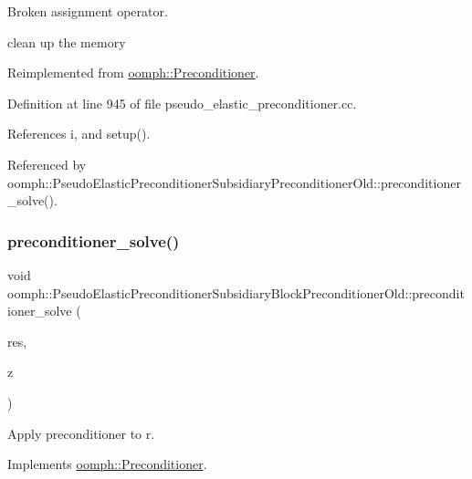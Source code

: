 Broken assignment operator. 

clean up the memory 

Reimplemented from \hyperlink{classoomph_1_1Preconditioner_a46c31c416829bedcd9db238431262027}{oomph\+::\+Preconditioner}.



Definition at line 945 of file pseudo\+\_\+elastic\+\_\+preconditioner.\+cc.



References i, and setup().



Referenced by oomph\+::\+Pseudo\+Elastic\+Preconditioner\+Subsidiary\+Preconditioner\+Old\+::preconditioner\+\_\+solve().

\mbox{\label{classoomph_1_1PseudoElasticPreconditionerSubsidiaryBlockPreconditionerOld_a31f3b927696c11c90f704178cae13e7e}} 
\subsubsection{\texorpdfstring{preconditioner\+\_\+solve()}{preconditioner\_solve()}}
{\footnotesize\ttfamily void oomph\+::\+Pseudo\+Elastic\+Preconditioner\+Subsidiary\+Block\+Preconditioner\+Old\+::preconditioner\+\_\+solve (\begin{DoxyParamCaption}\item[{const \hyperlink{classoomph_1_1DoubleVector}{Double\+Vector} \&}]{res,  }\item[{\hyperlink{classoomph_1_1DoubleVector}{Double\+Vector} \&}]{z }\end{DoxyParamCaption})\hspace{0.3cm}{\ttfamily [virtual]}}



Apply preconditioner to r. 



Implements \hyperlink{classoomph_1_1Preconditioner_ace1199369e4465cd2b9a34884bb64ec8}{oomph\+::\+Preconditioner}.




